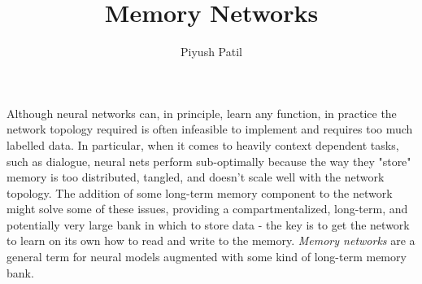 \documentclass{article}
\begin{document}
\title{Memory Networks}
\author{Piyush Patil}
\maketitle

Although neural networks can, in principle, learn any function, in practice the network topology required is often infeasible to implement and requires too much labelled data. In particular, when it comes to heavily context dependent tasks, such as dialogue, neural nets perform sub-optimally because the way they "store" memory is too distributed, tangled, and doesn't scale well with the network topology. The addition of some long-term memory component to the network might solve some of these issues, providing a compartmentalized, long-term, and potentially very large bank in which to store data - the key is to get the network to learn on its own how to read and write to the memory. \textit{Memory networks} are a general term for neural models augmented with some kind of long-term memory bank.
\end{document}
